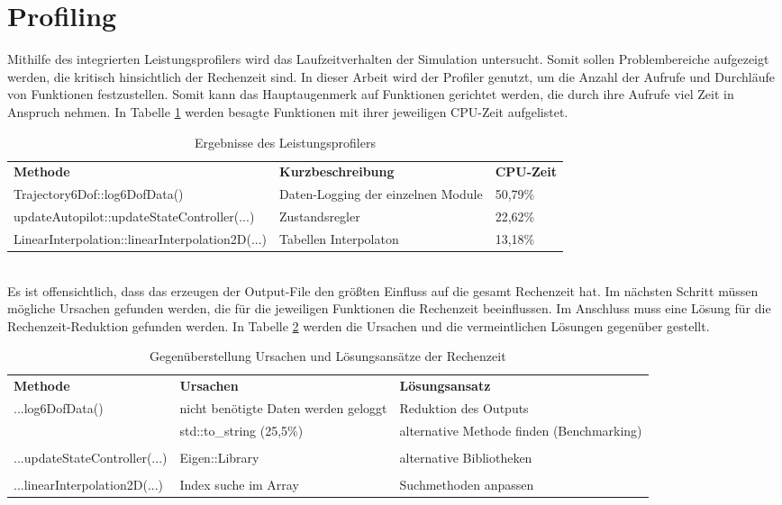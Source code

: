\section{Profiling}
Mithilfe des integrierten Leistungsprofilers wird das Laufzeitverhalten der Simulation untersucht. Somit sollen Problembereiche aufgezeigt werden, die kritisch hinsichtlich der Rechenzeit sind. In dieser Arbeit wird der Profiler genutzt, um die Anzahl der Aufrufe und Durchläufe von Funktionen festzustellen. Somit kann das Hauptaugenmerk auf Funktionen gerichtet werden, die durch ihre Aufrufe viel Zeit in Anspruch nehmen. In Tabelle \ref{tab:.profiler} werden besagte Funktionen mit ihrer jeweiligen CPU-Zeit aufgelistet. 
\begin{table}[h]
	\centering\begin{tabular}{lp{4cm}l}
		\textbf{Methode} & \textbf{Kurzbeschreibung} &\textbf{CPU-Zeit}\\
		Trajectory6Dof::log6DofData() & Daten-Logging der einzelnen Module&50,79\% \\
		updateAutopilot::updateStateController(...) & Zustandsregler & 22,62\% \\
		LinearInterpolation::linearInterpolation2D(...) & Tabellen Interpolaton & 13,18\%
	\end{tabular}
\caption{Ergebnisse des Leistungsprofilers}
\label{tab:.profiler}
\end{table}\noindent\\
Es ist offensichtlich, dass das erzeugen der Output-File den größten Einfluss auf die gesamt Rechenzeit hat. Im nächsten Schritt müssen mögliche Ursachen gefunden werden, die für die jeweiligen Funktionen die Rechenzeit beeinflussen. Im Anschluss muss eine Lösung für die Rechenzeit-Reduktion gefunden werden. In Tabelle \ref{tab:korrektur} werden die Ursachen und die vermeintlichen Lösungen gegenüber gestellt.
\begin{table}[h]
	\centering\begin{tabular}{lp{4cm}p{4cm}}
		\textbf{Methode} & \textbf{Ursachen} & \textbf{Lösungsansatz}\\
		...log6DofData() & nicht benötigte Daten werden geloggt & Reduktion des Outputs \\
									  & std::to\_string (25,5\%) & alternative Methode finden (Benchmarking)\\
									  &&\\
		...updateStateController(...) & Eigen::Library & alternative Bibliotheken \\	
									  &&\\
		...linearInterpolation2D(...)	& Index suche im Array & 	Suchmethoden anpassen		
	\end{tabular}
	\caption{Gegenüberstellung Ursachen und Lösungsansätze der Rechenzeit}
	\label{tab:korrektur}
\end{table}

